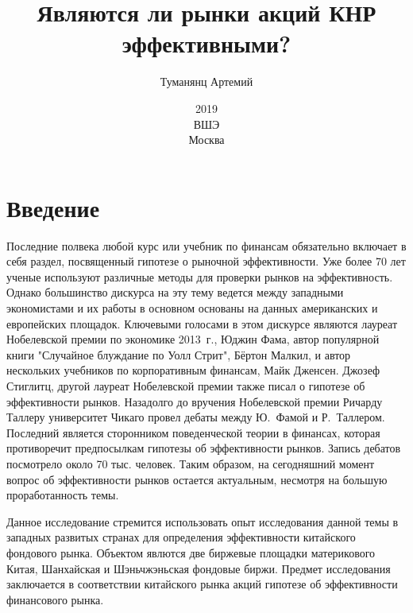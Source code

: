 \documentclass[a4paper,12pt]{article}
\title{Являются ли рынки акций КНР эффективными?}
\author{Туманянц Артемий}
\date{2019\\ВШЭ\\Москва}
\begin{document}
\maketitle


\newpage
\tableofcontents
\newpage
\section{Введение}

Последние полвека любой курс или учебник по финансам обязательно включает в себя раздел, посвященный гипотезе о рыночной эффективности. Уже более 70 лет ученые используют различные методы для проверки рынков на эффективность. Однако большинство дискурса на эту тему ведется между западными экономистами и их работы в основном основаны на данных американских и европейских площадок. Ключевыми голосами в этом дискурсе являются лауреат Нобелевской премии по экономике 2013~г., Юджин Фама, автор популярной книги "Случайное блуждание по Уолл Стрит", Бёртон Малкил, и автор нескольких учебников по корпоративным финансам, Майк Дженсен. Джозеф Стиглитц, другой лауреат Нобелевской премии также писал о гипотезе об эффективности рынков. Назадолго до вручения Нобелевской премии Ричарду Таллеру университет Чикаго провел дебаты между Ю.~Фамой и Р.~Таллером. Последний является сторонником поведенческой теории в финансах, которая противоречит предпосылкам гипотезы об эффективности рынков. Запись дебатов посмотрело около 70 тыс. человек. Таким образом, на сегодняшний момент вопрос об эффективности рынков остается актуальным, несмотря на большую проработанность темы.

Данное исследование стремится использовать опыт исследования данной темы в западных развитых странах для определения эффективности китайского фондового рынка. Объектом явлются две биржевые площадки материкового Китая, Шанхайская и Шэньчжэньская фондовые биржи. Предмет исследования заключается в соответствии китайского рынка акций гипотезе об эффективности финансового рынка.
\end{document}
